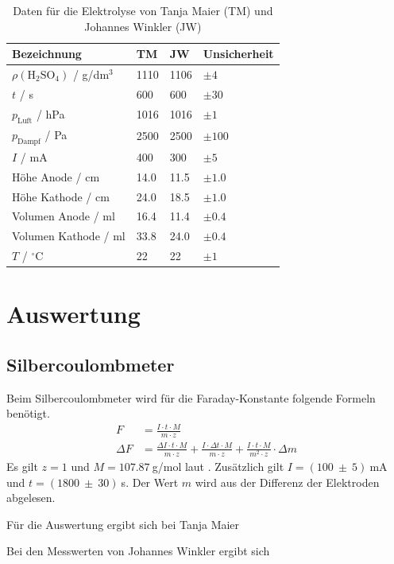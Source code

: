 \documentclass{article}
\begin{document}
\begin{table}[H]
\caption{Daten für die Elektrolyse von Tanja Maier (TM) und Johannes Winkler (JW)}

\begin{tabular}{l|lll}
Bezeichnung & TM & JW & Unsicherheit \\
\hline
$\rho({\text{H}_2\text{SO}_4})$ / g/dm${}^3$ & 1110 & 1106 & $\pm 4$ \\
$t$ / s & 600 & 600 & $\pm 30$ \\
$p_{\text{Luft}}$ / hPa & 1016 & 1016 & $\pm 1$ \\
$p_{\text{Dampf}}$ / Pa & 2500 & 2500 & $\pm 100$ \\
$I$ / mA & 400 & 300 & $\pm 5$ \\
Höhe Anode / cm & 14.0 & 11.5 & $\pm 1.0$ \\
Höhe Kathode / cm & 24.0 & 18.5 & $\pm 1.0$ \\
Volumen Anode / ml & 16.4 & 11.4 & $\pm 0.4$ \\
Volumen Kathode / ml & 33.8 & 24.0 & $\pm 0.4$ \\
$T$ / ${}^\circ$C & 22 & 22 & $\pm 1$
\end{tabular}

\end{table}



\section{Auswertung}

\subsection{Silbercoulombmeter}
Beim Silbercoulombmeter wird für die Faraday-Konstante folgende Formeln benötigt.
\begin{align*}
F &= \frac{I\cdot t\cdot M}{m\cdot z} \\
\Delta F &= \frac{\Delta I\cdot t\cdot M}{m\cdot z} + \frac{I\cdot \Delta t\cdot M}{m\cdot z} +\frac{I\cdot t\cdot M}{m^2\cdot z}\cdot \Delta m
\end{align*}
Es gilt $z=1$ und $M=107.87~$g/mol laut \cite{silber}. Zusätzlich gilt $I=(100~\pm~5)~$mA und $t=(1800~\pm~30)~$s. Der Wert $m$ wird aus der Differenz der Elektroden abgelesen.

Für die Auswertung ergibt sich bei Tanja Maier

Bei den Messwerten von Johannes Winkler ergibt sich

\end{document}

